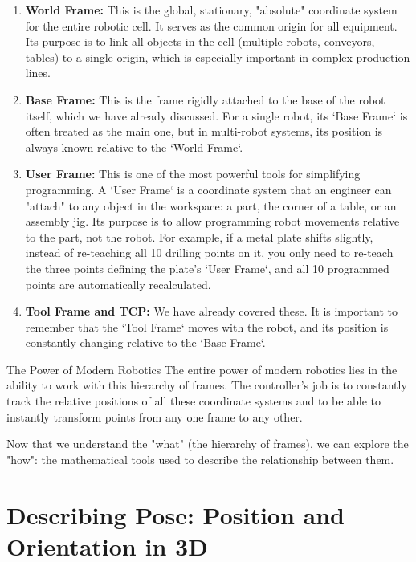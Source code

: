\begin{enumerate}
    \item \textbf{World Frame:} This is the global, stationary, "absolute" coordinate system for the entire robotic cell. It serves as the common origin for all equipment. Its purpose is to link all objects in the cell (multiple robots, conveyors, tables) to a single origin, which is especially important in complex production lines.

    \item \textbf{Base Frame:} This is the frame rigidly attached to the base of the robot itself, which we have already discussed. For a single robot, its `Base Frame` is often treated as the main one, but in multi-robot systems, its position is always known relative to the `World Frame`.

    \item \textbf{User Frame:} This is one of the most powerful tools for simplifying programming. A `User Frame` is a coordinate system that an engineer can "attach" to any object in the workspace: a part, the corner of a table, or an assembly jig. Its purpose is to allow programming robot movements relative to the part, not the robot. For example, if a metal plate shifts slightly, instead of re-teaching all 10 drilling points on it, you only need to re-teach the three points defining the plate's `User Frame`, and all 10 programmed points are automatically recalculated.

    \item \textbf{Tool Frame and TCP:} We have already covered these. It is important to remember that the `Tool Frame` moves with the robot, and its position is constantly changing relative to the `Base Frame`.
\end{enumerate}

\begin{principlebox}{The Power of Modern Robotics}
The entire power of modern robotics lies in the ability to work with this hierarchy of frames. The controller's job is to constantly track the relative positions of all these coordinate systems and to be able to instantly transform points from any one frame to any other.
\end{principlebox}

Now that we understand the "what" (the hierarchy of frames), we can explore the "how": the mathematical tools used to describe the relationship between them.

\section{Describing Pose: Position and Orientation in 3D}

